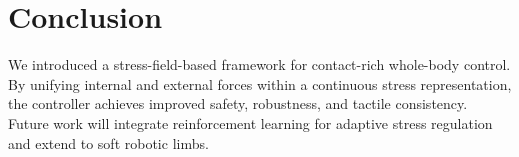 \documentclass[titlepage]{ltjsarticle}
\begin{document}
\section{Conclusion}
We introduced a stress-field-based framework for contact-rich whole-body control.
By unifying internal and external forces within a continuous stress representation, the controller achieves improved safety, robustness, and tactile consistency.
Future work will integrate reinforcement learning for adaptive stress regulation and extend to soft robotic limbs.



\end{document}
